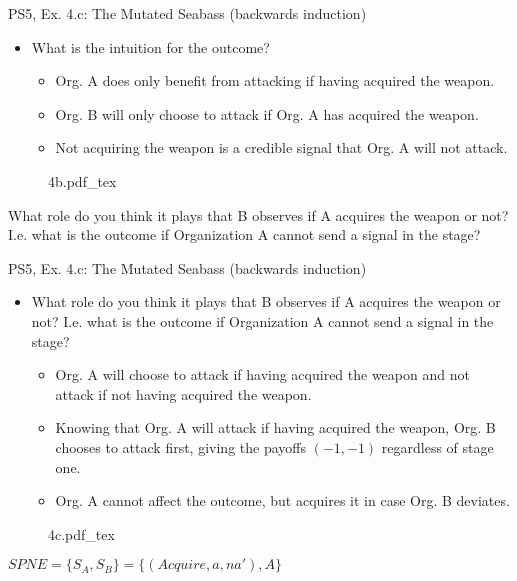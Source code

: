 \begin{frame}{PS5, Ex. 4.c: The Mutated Seabass (backwards induction)}
    \begin{itemize}
      \item[(c)] What is the intuition for the outcome?
      \begin{itemize}\normalsize
        \item[\nth{3} stage:] Org. A does only benefit from attacking if having acquired the weapon.
        \item[\nth{2} stage:] Org. B will only choose to attack if Org. A has acquired the weapon.
        \item[\nth{1} stage:] Not acquiring the weapon is a credible signal that Org. A will not attack.
      \end{itemize}
    \end{itemize}
    \vspace{-8pt}
    \begin{figure}[!h]
      \center
      \def\svgwidth{\columnwidth}
      {4b.pdf_tex}
    \end{figure}
    What role do you think it plays that B observes if A acquires the weapon or not?\\
    I.e. what is the outcome if Organization A cannot send a signal in the  stage?
  \vfill\null
\end{frame}
\begin{frame}{PS5, Ex. 4.c: The Mutated Seabass (backwards induction)}
    \begin{itemize}
      \item[(c)] What role do you think it plays that B observes if A acquires the weapon or not? I.e. what is the outcome if Organization A cannot send a signal in the  stage?
      \begin{itemize}\normalsize
        \item[\nth{3} stage:] [unchanged] Org. A will choose to attack if having acquired the weapon and not attack if not having acquired the weapon.
        \item[\nth{2} stage:] Knowing that Org. A will attack if having acquired the weapon, Org. B chooses to attack first, giving the payoffs $(-1,-1)$ regardless of stage one.
        \item[\nth{1} stage:] Org. A cannot affect the outcome, but acquires it in case Org. B deviates.
      \end{itemize}
    \end{itemize}
    \vspace{-8pt}
    \begin{figure}[!h]
      \center
      \def\svgwidth{\columnwidth}
      {4c.pdf_tex}
    \end{figure}
    \vspace{-2pt}
    $SPNE=\{S_A,S_B\}=\{ (Acquire, a, na'),A \}$
  \vfill\null
\end{frame}




